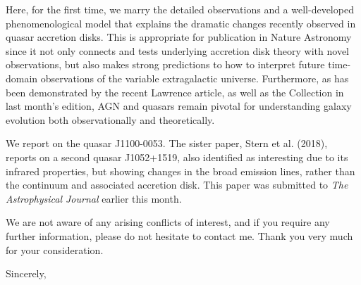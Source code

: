 \documentclass[11pt,a4paper]{letter} %
\begin{document}
\begin{letter}
Here, for the first time, we marry the detailed observations and a
well-developed phenomenological model that explains the dramatic changes
recently observed in quasar accretion disks. This is appropriate for
publication in Nature Astronomy since it not only connects and tests
underlying accretion disk theory with novel observations, but also
makes strong predictions to how to interpret future time-domain
observations of the variable extragalactic universe. Furthermore, as
has been demonstrated by the recent Lawrence article, as well as the
Collection in last month's edition, AGN and quasars remain pivotal for
understanding galaxy evolution both observationally and theoretically.

We report on the quasar J1100-0053. The sister paper, Stern et
al. (2018), reports on a second quasar J1052+1519, also identified as
interesting due to its infrared properties, but showing changes in the
broad emission lines, rather than the continuum and associated
accretion disk. This paper was submitted to {\it The Astrophysical
Journal} earlier this month.

We are not aware of any arising conflicts of interest, and if you
require any further information, please do not hesitate to contact
me. Thank you very much for your consideration.




\closing{Sincerely,}


\end{letter}
\end{document}
